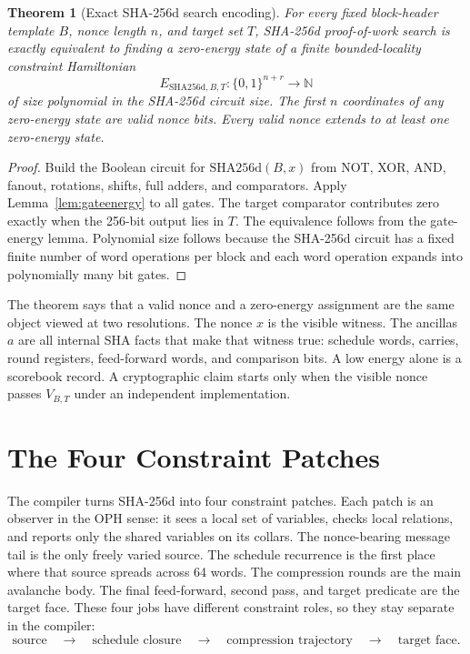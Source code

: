 \documentclass[11pt]{article}
\newtheorem{theorem}{Theorem}[section]
\theoremstyle{definition}
\theoremstyle{remark}
\newcommand{\bits}{\{0,1\}}
\newcommand{\shaD}{\mathrm{SHA256d}}
\begin{document}
\begin{theorem}[Exact SHA-256d search encoding]
\label{thm:shaencoding}
For every fixed block-header template \(B\), nonce length \(n\), and target
set \(T\), SHA-256d proof-of-work search is exactly equivalent to finding a
zero-energy state of a finite bounded-locality constraint Hamiltonian
\[
E_{\shaD,B,T}:\bits^{n+r}\to\mathbb N
\]
of size polynomial in the SHA-256d circuit size. The first \(n\) coordinates of
any zero-energy state are valid nonce bits. Every valid nonce extends to at
least one zero-energy state.
\end{theorem}

\begin{proof}
Build the Boolean circuit for \(\shaD(B,x)\) from NOT, XOR, AND, fanout,
rotations, shifts, full adders, and comparators. Apply
Lemma~\ref{lem:gateenergy} to all gates. The target comparator contributes
zero exactly when the 256-bit output lies in \(T\). The equivalence follows
from the gate-energy lemma. Polynomial size follows because the SHA-256d
circuit has a fixed finite number of word operations per block and each word
operation expands into polynomially many bit gates.
\end{proof}

The theorem says that a valid nonce and a zero-energy assignment are the same
object viewed at two resolutions. The nonce \(x\) is the visible witness. The
ancillas \(a\) are all internal SHA facts that make that witness true: schedule
words, carries, round registers, feed-forward words, and comparison bits. A
low energy alone is a scorebook record. A cryptographic claim starts only when
the visible nonce passes \(V_{B,T}\) under an independent implementation.

\section{The Four Constraint Patches}

The compiler turns SHA-256d into four constraint patches. Each patch is an
observer in the OPH sense: it sees a local set of variables, checks local
relations, and reports only the shared variables on its collars. The
nonce-bearing message tail is the only freely varied source. The schedule
recurrence is the first place where that source spreads across 64 words. The
compression rounds are the main avalanche body. The final feed-forward, second
pass, and target predicate are the target face. These four jobs have different
constraint roles, so they stay separate in the compiler:
\[
\text{source}\quad\longrightarrow\quad
\text{schedule closure}\quad\longrightarrow\quad
\text{compression trajectory}\quad\longrightarrow\quad
\text{target face}.
\]
\end{document}

